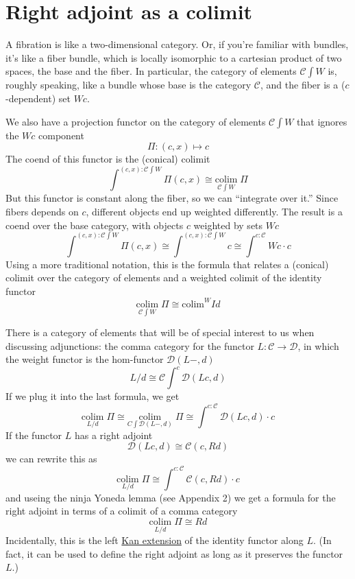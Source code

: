 \documentclass[11pt]{amsart}
\begin{document}
\section{Right adjoint as a colimit}

A fibration is like a two-dimensional category. Or, if you're familiar with bundles, it's like a fiber bundle, which is locally isomorphic to a cartesian product of two spaces, the base and the fiber. In particular, the category of elements $\mathcal{C} \int W$ is, roughly speaking, like a bundle whose base is the category $\mathcal{C}$, and the fiber is a ($c$-dependent) set $W c$. 

We also have a projection functor on the category of elements $\mathcal{C} \int W$ that ignores the $W c$ component
\[\Pi \colon (c, x) \mapsto c\] 
The coend of this functor is the (conical) colimit
\[\int^{(c, x) \colon \mathcal{C}\int W} \Pi (c, x) \cong \underset{\mathcal{C} \int W}{\mbox{colim}} \; \Pi  \]
But this functor is constant along the fiber, so we can ``integrate over it.'' Since fibers depends on $c$, different objects end up weighted differently. The result is a coend over the base category, with objects $c$ weighted by sets $W c$
\[\int^{(c, x) \colon \mathcal{C}\int W} \Pi (c, x) \cong \int^{(c, x) \colon \mathcal{C}\int W} c  \cong   \int^{c \colon \mathcal{C}} W c \cdot c\]
Using a more traditional notation, this is the formula that relates a (conical) colimit over the category of elements and a weighted colimit of the identity functor
\[\underset{\mathcal{C} \int W}{\mbox{colim}} \;  \Pi  \cong \mbox{colim}^W Id\]

There is a category of elements that will be of special interest to us when discussing adjunctions: the comma category for the functor $L \colon \mathcal{C} \to \mathcal{D}$, in which the weight functor is the hom-functor $\mathcal{D}(L-, d)$
\[L/d \cong \mathcal{C}\int^{c} \mathcal{D}(L c, d)\]
If we plug it into the last formula, we get
\[\underset{L/d}{\mbox{colim}} \;  \Pi  \cong \underset{C \int \mathcal{D}(L-, d)}{\mbox{colim}} \;  \Pi  \cong \int^{c \colon \mathcal{C}} \mathcal{D}(L c, d) \cdot c\]
If the functor $L$ has a right adjoint
\[\mathcal{D}(L c, d) \cong \mathcal{C}(c, R d)\]
we can rewrite this as
\[\underset{L/d}{\mbox{colim}} \;  \Pi  \cong \int^{c \colon \mathcal{C}} \mathcal{C}(c, R d) \cdot c\]
and useing the ninja Yoneda lemma (see Appendix 2) we get a formula for the right adjoint in terms of a colimit of a comma category
\[\underset{L/d}{\mbox{colim}} \; \Pi  \cong R d\]
Incidentally, this is the left \href{https://bartoszmilewski.com/2017/04/17/kan-extensions/}{Kan extension} of the identity functor along $L$. (In fact, it can be used to define the right adjoint as long as it preserves the functor $L$.)
\end{document}
